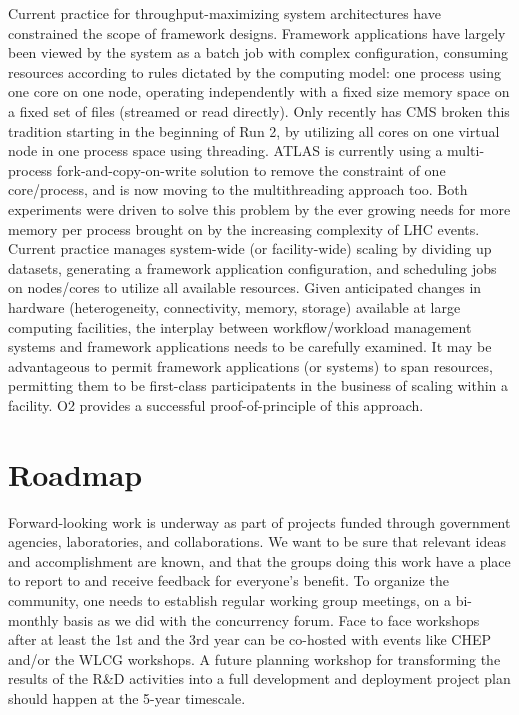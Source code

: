 \documentclass[12pt,a4paper]{article}
\begin{document}
Current practice for throughput-maximizing system architectures have
constrained the scope of framework designs. Framework applications
have largely been viewed by the system as a batch job with complex
configuration, consuming resources according to rules dictated by the
computing model: one process using one core on one node, operating
independently with a fixed size memory space on a fixed set of files
(streamed or read directly). Only recently has CMS broken this
tradition starting in the beginning of Run 2, by utilizing all cores
on one virtual node in one process space using threading. ATLAS is
currently using a multi-process fork-and-copy-on-write solution to
remove the constraint of one core/process, and is now moving to the
multithreading approach too. Both experiments were
driven to solve this problem by the ever growing needs for more
memory per process brought on by the increasing complexity of LHC
events. Current practice manages system-wide (or facility-wide)
scaling by dividing up datasets, generating a framework application
configuration, and scheduling jobs on nodes/cores to utilize all
available resources. Given anticipated changes in hardware
(heterogeneity, connectivity, memory, storage) available at large
computing facilities, the interplay between workflow/workload
management systems and framework applications needs to be carefully
examined. It may be advantageous to permit framework applications (or
systems) to span resources, permitting them to be first-class
participatents in the business of scaling within a facility. O2 provides
a successful proof-of-principle of this approach.


\section{Roadmap}
\label{sec:roadmap}
Forward-looking work is underway as part of projects funded through government agencies, laboratories, and collaborations.  We want to be sure that relevant ideas and accomplishment are known, and that the groups doing this work have a place to report to and receive feedback for everyone’s benefit.
To organize the community, one needs to establish regular working group meetings, on a bi-monthly basis as we did with the concurrency forum. Face to face workshops after at least the 1st and the 3rd year can be co-hosted with events like CHEP and/or the WLCG workshops. A future planning workshop for transforming the results of the R\&D activities into a full development and deployment project plan should happen at the 5-year timescale.
\end{document}
